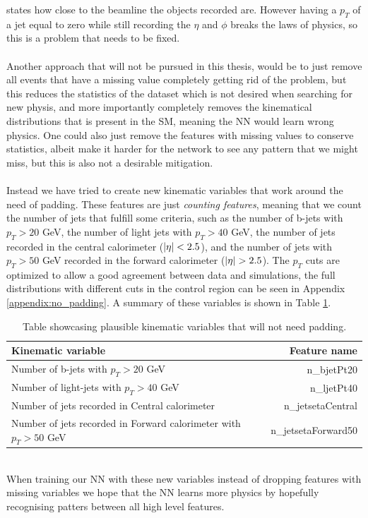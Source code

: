 \documentclass[14pt, a4paper]{book}
\begin{document}
states how close to the beamline the objects recorded are. However having a $p_T$ of a jet equal to zero while still recording the $\eta$ and $\phi$ breaks the laws of physics, so this is a problem that needs to be fixed.\\
\\Another approach that will not be pursued in this thesis, would be to just remove all events that have a missing value completely getting rid of the problem, but this reduces the statistics of the dataset which is not desired when searching for new physis, and more importantly completely 
removes the kinematical distributions that is present in the SM, meaning the NN would learn wrong physics.
One could also just remove the features with missing values to conserve statistics, albeit make it harder for the network to see any pattern that we might miss, but this is also not a desirable mitigation.\\
\\Instead we have tried to create new kinematic variables that work around the need of padding. These features are just \textit{counting features}, meaning that we count the number of jets that fulfill some criteria, 
such as the number of b-jets with $p_T > 20$ GeV, the number of light jets with $p_T>40$ GeV, the number of jets recorded in the central calorimeter ($\abs{\eta} < 2.5$), and the number of 
jets with $p_T>50$ GeV recorded in the forward calorimeter ($\abs{\eta} > 2.5$). The $p_T$ cuts are optimized to allow a good agreement between data and simulations, the full distributions with different cuts in the control region can be seen in Appendix \ref{appendix:no_padding}. 
A summary of these variables is shown in Table \ref{tab:padding_variables}.\\
\begin{table}[!h]
   \centering
   \caption[New kinematic variables that need no padding]{Table showcasing plausible kinematic variables that will not need padding.}
   \begin{tabular}{l|r}\midrule\midrule
      Kinematic variable                                                      & Feature name          \\\midrule
      Number of b-jets with $p_T > 20$ GeV                                    & n\_bjetPt20\\
      Number of light-jets with $p_T > 40$ GeV                                & n\_ljetPt40\\
      Number of jets recorded in Central calorimeter                          &n\_jetsetaCentral\\
      Number of jets recorded in Forward calorimeter with $p_T > 50$ GeV      & n\_jetsetaForward50\\\midrule\midrule
   \end{tabular}
   \label{tab:padding_variables}
\end{table}
\\When training our NN with these new variables instead of dropping features with missing variables we hope that the NN learns more physics by hopefully recognising patters between all high level features. 
\end{document}
